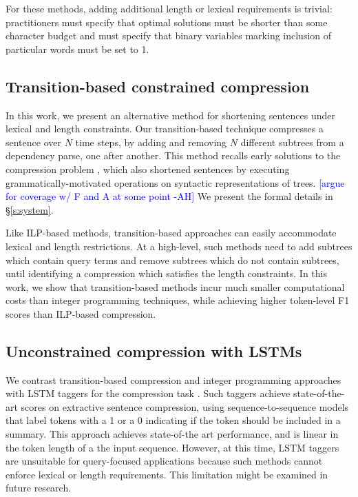 \documentclass[11pt,a4paper]{article}
\newcommand{\ahcomment}[1]{\textcolor{blue}{[#1 -AH]}}
\begin{document}
For these methods, adding additional length or lexical requirements is trivial: practitioners must specify that optimal solutions must be shorter than some character budget and must specify that binary variables marking inclusion of particular words must be set to 1. 

\subsection{Transition-based constrained compression}

In this work, we present an alternative method for shortening sentences under lexical and length constraints. Our transition-based technique compresses a sentence over $N$ time steps, by adding and removing $N$ different subtrees from a dependency parse, one after another. This method recalls early solutions to the compression problem \cite{Jing2000SentenceRF,Knight2000StatisticsBasedS}, which also shortened sentences by executing grammatically-motivated operations on syntactic representations of trees. \ahcomment{argue for coverage w/ F and A at some point} We present the formal details in \S\ref{s:system}.

Like ILP-based methods, transition-based approaches can easily accommodate lexical and length restrictions. At a high-level, such methods need to add subtrees which contain query terms and remove subtrees which do not contain subtrees, until identifying a compression which satisfies the length constraints. In this work, we show that transition-based methods incur much smaller computational costs than integer programming techniques, while achieving higher token-level F1 scores than ILP-based compression.

\subsection{Unconstrained compression with LSTMs}

We contrast transition-based compression and integer programming approaches with LSTM taggers for the compression task \cite{filippova2015sentence}. Such taggers achieve state-of-the-art scores on extractive sentence compression, using sequence-to-sequence models that label tokens with a 1 or a 0 indicating if the token should be included in a summary. This approach achieves state-of-the art performance, and is linear in the token length of a the input sequence. However, at this time, LSTM taggers are unsuitable for query-focused applications because such methods cannot enforce lexical or length requirements. This limitation might be examined in future research.
\end{document}
